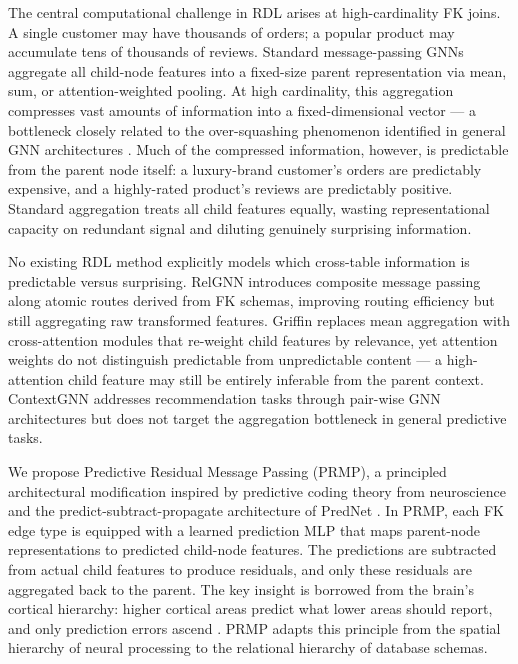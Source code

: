 \documentclass[11pt,letterpaper]{article}
\begin{document}
The central computational challenge in RDL arises at high-cardinality FK joins. A single customer may have thousands of orders; a popular product may accumulate tens of thousands of reviews. Standard message-passing GNNs \citep{Hamilton2017, Velickovic2018} aggregate all child-node features into a fixed-size parent representation via mean, sum, or attention-weighted pooling. At high cardinality, this aggregation compresses vast amounts of information into a fixed-dimensional vector --- a bottleneck closely related to the over-squashing phenomenon identified in general GNN architectures \citep{Alon2021, Topping2022}. Much of the compressed information, however, is predictable from the parent node itself: a luxury-brand customer's orders are predictably expensive, and a highly-rated product's reviews are predictably positive. Standard aggregation treats all child features equally, wasting representational capacity on redundant signal and diluting genuinely surprising information.

No existing RDL method explicitly models which cross-table information is predictable versus surprising. RelGNN \citep{Chen2025} introduces composite message passing along atomic routes derived from FK schemas, improving routing efficiency but still aggregating raw transformed features. Griffin \citep{Wang2025} replaces mean aggregation with cross-attention modules that re-weight child features by relevance, yet attention weights do not distinguish predictable from unpredictable content --- a high-attention child feature may still be entirely inferable from the parent context. ContextGNN \citep{Yuan2025} addresses recommendation tasks through pair-wise GNN architectures but does not target the aggregation bottleneck in general predictive tasks.

We propose Predictive Residual Message Passing (PRMP), a principled architectural modification inspired by predictive coding theory from neuroscience \citep{Rao1999} and the predict-subtract-propagate architecture of PredNet \citep{Lotter2017}. In PRMP, each FK edge type is equipped with a learned prediction MLP that maps parent-node representations to predicted child-node features. The predictions are subtracted from actual child features to produce residuals, and only these residuals are aggregated back to the parent. The key insight is borrowed from the brain's cortical hierarchy: higher cortical areas predict what lower areas should report, and only prediction errors ascend \citep{Rao1999}. PRMP adapts this principle from the spatial hierarchy of neural processing to the relational hierarchy of database schemas.
\end{document}
